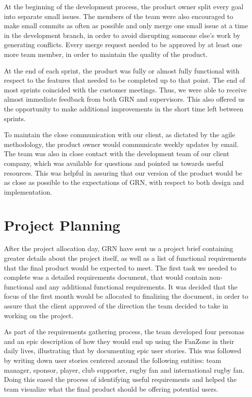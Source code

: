 \documentclass{l3proj}
\begin{document}
 

 At the beginning of the development process, the product owner split every goal into separate small issues. The members of the team were also encouraged to make small commits as often as possible and only merge one small issue at a time in the development branch, in order to avoid disrupting someone else's work by generating conflicts. Every merge request needed to be approved by at least one more team member, in order to maintain the quality of the product.

 At the end of each sprint, the product was fully or almost fully functional with respect to the features that needed to be completed up to that point. The end of most sprints coincided with the customer meetings. Thus, we were able to receive almost immediate feedback from both GRN and supervisors. This also offered us the opportunity to make additional improvements in the short time left between sprints.

 To maintain the close communication with our client, as dictated by the agile methodology, the product owner would communicate weekly updates by email. The team was also in close contact with the development team of our client company, which was available for questions and pointed us towards useful resources. This was helpful in assuring that our version of the product would be as close as possible to the expectations of GRN, with respect to both design and implementation.


\newpage
\section{Project Planning}
\label{sec:planning}

After the project allocation day, GRN have sent us a project brief containing greater details about the project itself, as well as a list of functional requirements that the final product would be expected to meet. The first task we needed to complete was a detailed requirements document, that would contain non-functional and any additional functional requirements. It was decided that the focus of the first month would be allocated to finalizing the document, in order to assure that the client approved of the direction the team decided to take in working on the project.

As part of the requirements gathering process, the team developed four personas and an epic description of how they would end up using the FanZone in their daily lives, illustrating that by documenting epic user stories. This was followed by writing down user stories centered around the following entities: team manager, sponsor, player, club supporter, rugby fan and international rugby fan. Doing this eased the process of identifying useful requirements and helped the team visualize what the final product should be offering potential users.
\end{document}
